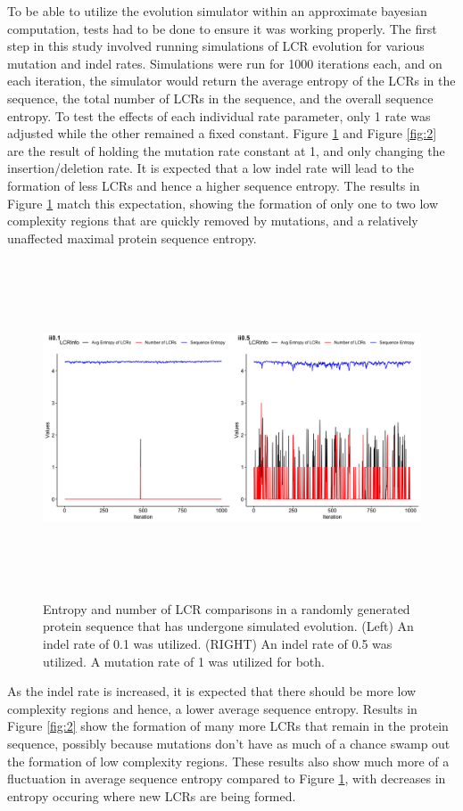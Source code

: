 \documentclass[10pt]{article}
\providecommand{\figref}[1]{Figure \ref{#1}}  %
\begin{document}
To be able to utilize the evolution simulator within an approximate bayesian computation, tests had to be done to ensure it was working properly. The first step in this study involved running simulations of LCR evolution for various mutation and indel rates. Simulations were run for 1000 iterations each, and on each iteration, the simulator would return the average entropy of the LCRs in the sequence, the total number of LCRs in the sequence, and the overall sequence entropy. To test the effects of each individual rate parameter, only 1 rate was adjusted while the other remained a fixed constant. \figref{fig:1} and \figref{fig:2} are the result of holding the mutation rate constant at 1, and only changing the insertion/deletion rate. It is expected that a low indel rate will lead to the formation of less LCRs and hence a higher sequence entropy. The results in \figref{fig:1} match this expectation, showing the formation of only one to two low complexity regions that are quickly removed by mutations, and a relatively unaffected maximal protein sequence entropy. 

\begin{figure}[H]
	\includegraphics[width=18cm, height=10cm]{im0.01-0.1-0.5.jpeg}
	\caption{Entropy and number of LCR comparisons in a randomly generated protein sequence that has undergone simulated evolution. (Left) An indel rate of 0.1 was utilized. (RIGHT) An indel rate of 0.5 was utilized. A mutation rate of 1 was utilized for both.}
	\label{fig:1}
\end{figure}

As the indel rate is increased, it is expected that there should be more low complexity regions and hence, a lower average sequence entropy. Results in \figref{fig:2} show the formation of many more LCRs that remain in the protein sequence, possibly because mutations don't have as much of a chance swamp out the formation of low complexity regions. These results also show much more of a fluctuation in average sequence entropy compared to \figref{fig:1}, with decreases in entropy occuring where new LCRs are being formed.
\end{document}
